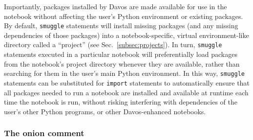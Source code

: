 \documentclass[preprint,12pt,a4paper]{elsarticle}
\begin{document}
Importantly, packages installed by Davos are made available for use in the
notebook without affecting the user's Python environment or existing packages.
By default, \texttt{smuggle} statements will install missing packages (and any
missing dependencies of those packages) into a notebook-specific, virtual
environment-like directory called a ``project'' (see
Sec.~\ref{subsec:projects}). In turn, \texttt{smuggle} statements executed in a
particular notebook will preferentially load packages from the notebook's
project directory whenever they are available, rather than searching for them
in the user's main Python environment. In this way, \texttt{smuggle}
statements can be substituted for \texttt{import} statements to automatically
ensure that all packages needed to run a notebook are installed and available
at runtime each time the notebook is run, without risking interfering with
dependencies of the user's other Python programs, or other Davos-enhanced
notebooks.


\subsubsection{The onion comment}\label{subsec:onion}
\end{document}
